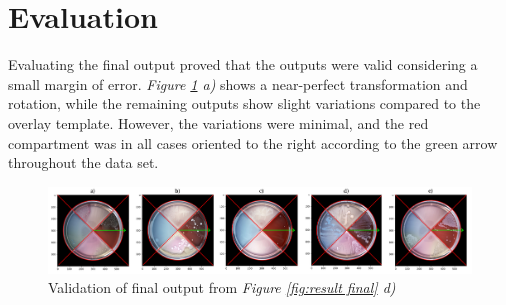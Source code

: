 \section{Evaluation}
Evaluating the final output proved that the outputs were valid considering a small margin of error. \textit{Figure \ref{fig:result evaluation} a)} shows a near-perfect transformation and rotation, while the remaining outputs show slight variations compared to the overlay template. However, the variations were minimal, and the red compartment was in all cases oriented to the right according to the green arrow throughout the data set. 
\begin{figure}[H]
      \centering
      \includegraphics[width=1\linewidth]{figures/PDF/Evaluation_result.pdf}
    \caption{Validation of final output from \textit{Figure \ref{fig:result final} d)}}
    \label{fig:result evaluation}
\end{figure}






